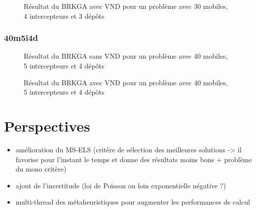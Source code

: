                 \begin{figure}[H]
                	
                \caption{Résultat du BRKGA avec VND pour un problème avec 30 mobiles, 4 intercepteurs et 3 dépôts}
				\label{fig:30m4i3d-avecvnd}
				\end{figure}
				
            \subsubsection{40m5i4d}
            	\begin{figure}[H]
                	
                \caption{Résultat du BRKGA sans VND pour un problème avec 40 mobiles, 5 intercepteurs et 4 dépôts}
				\label{fig:40m5i4d-sansvnd}
                \end{figure}
                
                \begin{figure}[H]
                	
                \caption{Résultat du BRKGA avec VND pour un problème avec 40 mobiles, 5 intercepteurs et 4 dépôts}
				\label{fig:40m5i4d-avecvnd}
				\end{figure}
				

    \section{Perspectives}
    
    	\begin{itemize}
    		\item amélioration du MS-ELS (critère de sélection des meilleures solutions -> il favorise pour l'instant le temps et donne des résultats moins bons + problème du mono critère)
    		\item ajout de l'incertitude (loi de Poisson ou loin exponentielle négative ?)
    		\item multi-thread des métaheuristiques pour augmenter les performances de calcul
    	\end{itemize}
    		
